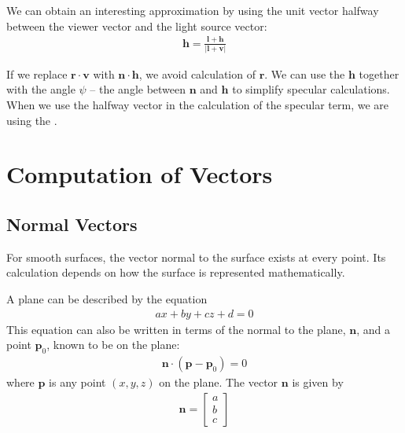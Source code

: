 \documentclass[../COS3712_Notes.tex]{subfiles}
\begin{document}
        We can obtain an interesting approximation by using the unit vector halfway
        between the viewer vector and the light source vector:
        \begin{align*}
          \mathbf{h} = \frac{\mathbf{l} + \mathbf{h}}{\lvert \mathbf{l} + \mathbf{v} \rvert}
        \end{align*}

        If we replace $\mathbf{r} \cdot \mathbf{v}$ with $\mathbf{n} \cdot \mathbf{h}$,
        we avoid calculation of $\mathbf{r}$.
        We can use the  $\mathbf{h}$ together with the angle $\psi$
        -- the angle between $\mathbf{n}$ and $\mathbf{h}$ to simplify specular calculations.
        When we use the halfway vector in the calculation of the specular term,
        we are using the .

    \section{Computation of Vectors}
      \subsection{Normal Vectors}
        For smooth surfaces, the vector normal to the surface exists at every point.
        Its calculation depends on how the surface is represented mathematically.

        A plane can be described by the equation
        \begin{align*}
          ax + by + cz + d = 0
        \end{align*}
        This equation can also be written in terms of the normal to the plane, $\mathbf{n}$,
        and a point $\mathbf{p}_0$, known to be on the plane:
        \begin{align*}
          \mathbf{n} \cdot (\mathbf{p} - \mathbf{p}_0) = 0
        \end{align*}
        where $\mathbf{p}$ is any point $(x, y, z)$ on the plane.
        The vector $\mathbf{n}$ is given by
        \begin{align*}
          \mathbf{n} = \begin{bmatrix}
            a \\
            b \\
            c
          \end{bmatrix}
        \end{align*}
\end{document}
